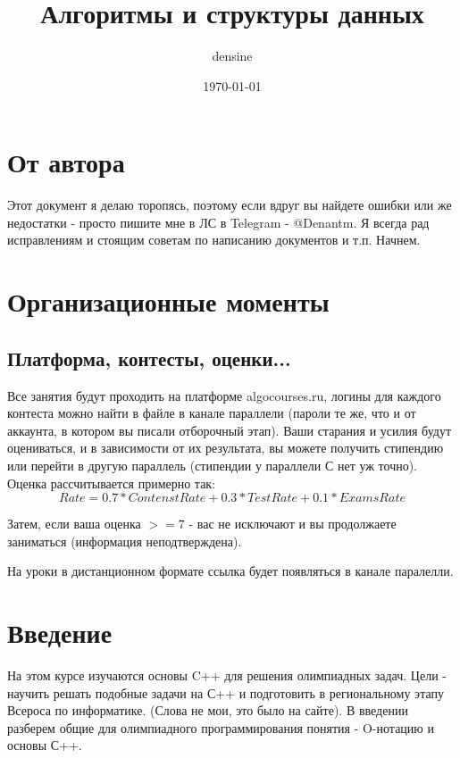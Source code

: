 \documentclass[a4paper,12pt]{article}
\title{Алгоритмы и структуры данных}
\author{densine}
\date{\today}
\begin{document}
\maketitle
\tableofcontents

\section{От автора}
Этот документ я делаю торопясь, поэтому если вдруг вы найдете ошибки или же недостатки -
просто пишите мне в ЛС в Telegram - @Denantm. Я всегда рад исправлениям и стоящим
советам по написанию документов и т.п. Начнем.

\section{Организационные моменты}

\subsection{Платформа, контесты, оценки...}
Все занятия будут проходить на платформе algocourses.ru, логины для каждого контеста можно
найти в файле в канале параллели (пароли те же, что и от аккаунта, в котором вы писали
отборочный этап).
Ваши старания и усилия будут оцениваться, и в зависимости от их результата, вы можете получить
стипендию или перейти в другую параллель (стипендии у параллели С нет уж точно).
Оценка рассчитывается примерно так:
\[
Rate = 0.7 * ContenstRate + 0.3 * TestRate + 0.1 * ExamsRate
\]

Затем, если ваша оценка  $>=7$ - вас не исключают и вы продолжаете заниматься (информация
неподтверждена).

На уроки в дистанционном формате ссылка будет появляться в канале паралелли.

\section{Введение}
На этом курсе изучаются основы C++ для решения олимпиадных задач. Цели - научить
решать подобные задачи на С++ и подготовить в региональному этапу Всероса по информатике.
(Слова не мои, это было на сайте). В введении разберем общие для олимпиадного
программирования понятия - O-нотацию и основы С++.
\end{document}
